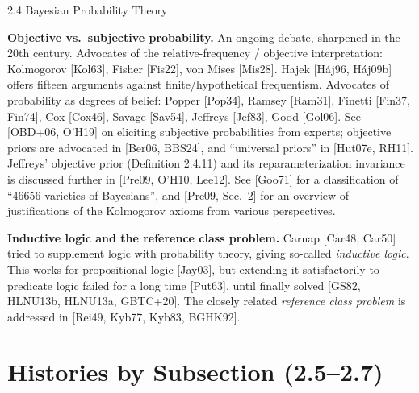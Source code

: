 \documentclass[aspectratio=169,10pt]{beamer}
\begin{document}
\begin{frame}[allowframebreaks]{2.4 Bayesian Probability Theory}
  \framebreak

  \textbf{Objective vs.\ subjective probability.} An ongoing debate,
  sharpened in the 20th century. Advocates of the relative-frequency /
  objective interpretation: Kolmogorov [Kol63], Fisher [Fis22], von Mises
  [Mis28]. Hajek [Háj96, Háj09b] offers fifteen arguments against
  finite/hypothetical frequentism. Advocates of probability as degrees of
  belief: Popper [Pop34], Ramsey [Ram31], Finetti [Fin37, Fin74], Cox
  [Cox46], Savage [Sav54], Jeffreys [Jef83], Good [Gol06]. See [OBD+06,
  O'H19] on eliciting subjective probabilities from experts; objective
  priors are advocated in [Ber06, BBS24], and ``universal priors'' in
  [Hut07e, RH11]. Jeffreys' objective prior (Definition 2.4.11) and its
  reparameterization invariance is discussed further in [Pre09, O'H10,
  Lee12]. See [Goo71] for a classification of ``46656 varieties of
  Bayesians'', and [Pre09, Sec.\ 2] for an overview of justifications of the
  Kolmogorov axioms from various perspectives.

  \framebreak

  \textbf{Inductive logic and the reference class problem.} Carnap [Car48,
  Car50] tried to supplement logic with probability theory, giving
  so-called \emph{inductive logic}. This works for propositional logic
  [Jay03], but extending it satisfactorily to predicate logic failed for a
  long time [Put63], until finally solved [GS82, HLNU13b, HLNU13a,
  GBTC+20]. The closely related \emph{reference class problem} is addressed
  in [Rei49, Kyb77, Kyb83, BGHK92].
\end{frame}

\section{Histories by Subsection (2.5--2.7)}
\end{document}
